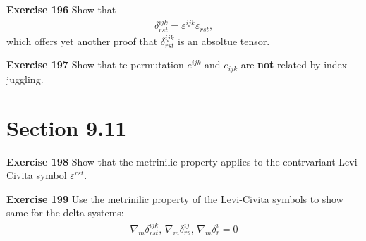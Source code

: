 \documentclass[12pt,a4paper]{report}
\begin{document}
\begin{description}
\item \textbf{Exercise 196} Show that 
\begin{align*}
	\delta_{rst}^{ijk} = \varepsilon^{ijk}\varepsilon_{rst},
\end{align*}which offers yet another proof that $\delta_{rst}^{ijk}$ is an absoltue tensor.
\item \textbf{Exercise 197} Show that te permutation $e^{ijk}$ and $e_{ijk}$ are \textbf{not} related by index juggling.
\section{Section 9.11}
\item \textbf{Exercise 198} Show that the metrinilic property applies to the contrvariant Levi-Civita symbol $\varepsilon^{rst}$.
\item \textbf{Exercise 199} Use the metrinilic property of the Levi-Civita symbols to show same for the delta systems:
\begin{align*}
	\nabla_m\delta_{rst}^{ijk}, \, \nabla_m\delta_{rs}^{ij}, \, \nabla_m \delta_r^i = 0
\end{align*}


\end{description}
\end{document}
